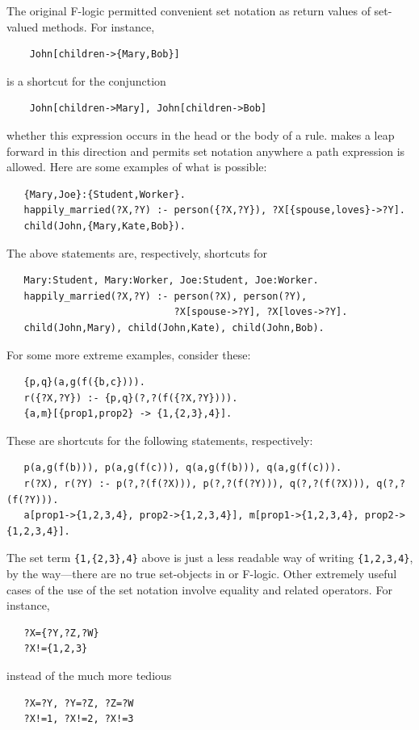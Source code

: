 \documentclass[11pt]{article}
\newcommand{\ERGO}{\mbox{\smaller{\ensuremath{\cal{E}}\smaller{{\sc{RGO}}}}}\xspace}
\newcommand{\FLSYSTEM}{\ERGO}
\begin{document}
The original F-logic \cite{KLW95} permitted convenient set notation as
return values of set-valued methods. For instance,
\begin{verbatim}
    John[children->{Mary,Bob}]
\end{verbatim}
is a shortcut for the conjunction
\begin{verbatim}
    John[children->Mary], John[children->Bob]
\end{verbatim}
whether this expression occurs in the head or the body of a rule. \FLSYSTEM
makes a leap forward in this direction and permits set notation anywhere a
path expression is allowed. Here are some examples of what is possible:
\begin{verbatim}
   {Mary,Joe}:{Student,Worker}.
   happily_married(?X,?Y) :- person({?X,?Y}), ?X[{spouse,loves}->?Y].
   child(John,{Mary,Kate,Bob}).
\end{verbatim}
The above statements are, respectively, shortcuts for 
\begin{verbatim}
   Mary:Student, Mary:Worker, Joe:Student, Joe:Worker.
   happily_married(?X,?Y) :- person(?X), person(?Y),
                             ?X[spouse->?Y], ?X[loves->?Y].
   child(John,Mary), child(John,Kate), child(John,Bob).
\end{verbatim}
For some more extreme examples, consider these:
\begin{verbatim}
   {p,q}(a,g(f({b,c}))).
   r({?X,?Y}) :- {p,q}(?,?(f({?X,?Y}))).
   {a,m}[{prop1,prop2} -> {1,{2,3},4}].
\end{verbatim}
These are shortcuts for the following statements, respectively:
\begin{verbatim}
   p(a,g(f(b))), p(a,g(f(c))), q(a,g(f(b))), q(a,g(f(c))).
   r(?X), r(?Y) :- p(?,?(f(?X))), p(?,?(f(?Y))), q(?,?(f(?X))), q(?,?(f(?Y))).
   a[prop1->{1,2,3,4}, prop2->{1,2,3,4}], m[prop1->{1,2,3,4}, prop2->{1,2,3,4}].
\end{verbatim}
The set term \texttt{\{1,\{2,3\},4\}} above is just a less readable way of
writing \texttt{\{1,2,3,4\}}, by the way---there are no true set-objects in
\FLSYSTEM or F-logic.
Other extremely useful cases of the use of the set notation involve equality and related
operators. For instance,
\begin{verbatim}
   ?X={?Y,?Z,?W}
   ?X!={1,2,3}
\end{verbatim}
instead of the much more tedious
\begin{verbatim}
   ?X=?Y, ?Y=?Z, ?Z=?W
   ?X!=1, ?X!=2, ?X!=3
\end{verbatim}
\end{document}
